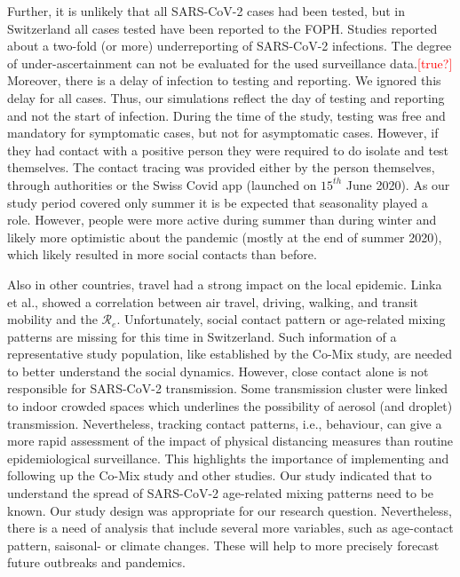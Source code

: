\documentclass[10pt, a4paper, twoside]{article}
\begin{document}
\begin{multicols}{2}
Further, it is unlikely that all SARS-CoV-2 cases had been tested, but in Switzerland all cases tested have been reported to the FOPH.
Studies reported about a two-fold (or more) underreporting of SARS-CoV-2 infections.\cite{Li_substantial_2020,Wu_substantial_2020}
The degree of under-ascertainment can not be evaluated for the used surveillance data.\textcolor{red}{[true?]}
Moreover, there is a delay of infection to testing and reporting.
We ignored this delay for all cases.
Thus, our simulations reflect the day of testing and reporting and not the start of infection.
During the time of the study, testing was free and mandatory for symptomatic cases, but not for asymptomatic cases.
However, if they had contact with a positive person they were required to do isolate and test themselves. 
The contact tracing was provided either by the person themselves, through authorities or the Swiss Covid app (launched on $15^{th}$ June 2020).\cite{salath_early_2020}
As our study period covered only summer it is be expected that seasonality played a role.
However, people were more active during summer than during winter and likely more optimistic about the pandemic (mostly at the end of summer 2020), which likely resulted in more social contacts than before.

Also in other countries, travel had a strong impact on the local epidemic.\cite{russell_effect_2021,hodcroft_emergence_2020}
Linka et al., showed a correlation between air travel, driving, walking, and transit mobility and the $\mathcal{R}_e$.\cite{linka_reproduction_2020}
Unfortunately, social contact pattern or age-related mixing patterns are missing for this time in Switzerland.
Such information of a representative study population, like established by the Co-Mix study, are needed to better understand the social dynamics.\cite{coletti_comix_2020}
However, close contact alone is not responsible for SARS-CoV-2 transmission.
Some transmission cluster were linked to indoor crowded spaces which underlines the possibility of aerosol (and droplet) transmission.\cite{tang_aerosol_2020}
Nevertheless, tracking contact patterns, i.e., behaviour, can give a more rapid assessment of the impact of physical distancing measures than routine epidemiological surveillance.\cite{jarvis_quantifying_2020}
This highlights the importance of implementing and following up the Co-Mix study and other studies.
Our study indicated that to understand the spread of SARS-CoV-2  age-related mixing patterns need to be known.
Our study design was appropriate for our research question.
Nevertheless, there is a need of analysis that include several more variables, such as age-contact pattern, saisonal- or climate changes.
These will help to more precisely forecast future outbreaks and pandemics.


\end{multicols}
\end{document}
